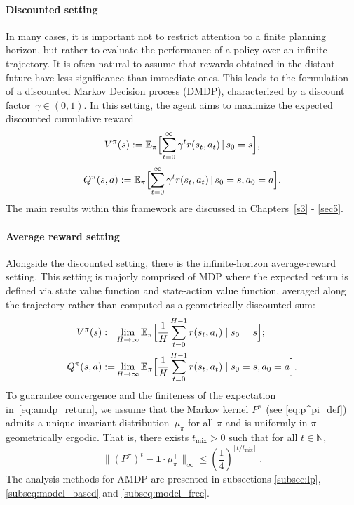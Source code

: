 \documentclass{article}
\numberwithin{equation}{section}
\newcommand{\E}{\mathbb E}
\newcommand{\eqsp}{\;}
\begin{document}
\paragraph{Discounted setting}
In many cases, it is important not to restrict attention to a finite planning horizon, but rather to evaluate the performance of a policy over an infinite trajectory. It is often natural to assume that rewards obtained in the distant future have less significance than immediate ones. This leads to the formulation of a discounted Markov Decision process (DMDP), characterized by a discount factor~$\gamma \in (0,1)$. In this setting, the agent aims to maximize the expected discounted cumulative reward
\begin{equation}\label{eq:value_function}
    V^\pi (s) := \E_\pi \Bigl[ \sum_{t=0}^\infty \gamma^t r(s_t, a_t)\, |\, s_0 = s \Bigr],
\end{equation}
\begin{equation}\label{eq:action_value}
    Q^\pi (s, a) := \E_\pi \Bigl[ \sum_{t=0}^\infty \gamma^t r(s_t, a_t)\, |\, s_0 = s, a_0=a \Bigr].
\end{equation}
The main results within this framework are discussed in Chapters~\ref{s3} - \ref{sec5}.

\paragraph{Average reward setting}
Alongside the discounted setting, there is the infinite-horizon average-reward setting. This setting is majorly comprised of MDP where the expected return is defined via state value function and state-action value function, averaged along the trajectory rather than computed as a geometrically discounted sum:
\begin{equation}\label{eq:amdp_return}
   \begin{aligned}
       V^{\pi} (s) :=& \lim\limits_{H\rightarrow\infty}\mathbb{E}_{\pi}\Bigl[\frac{1}{H}\sum\limits_{t = 0}^{H - 1}r(s_t, a_t)\mid s_0 = s\Bigr];\\
       Q^{\pi} (s, a) :=& \lim\limits_{H\rightarrow\infty}\mathbb{E}_{\pi}\Bigl[\frac{1}{H}\sum\limits_{t = 0}^{H - 1}r(s_t, a_t)\mid s_{0} = s, a_{0} = a\Bigr].
   \end{aligned} 
\end{equation}
To guarantee convergence and the finiteness of the expectation in~\eqref{eq:amdp_return}, we assume that the Markov kernel $P^{\pi}$ (see \eqref{eq:p^pi_def}) admits a unique invariant distribution~$\mu_\pi$ for all $\pi$ and is uniformly in $\pi$ geometrically ergodic. That is, there exists $t_{\operatorname{mix}}>0$ such that for all $t \in \mathbb{N}$,
\begin{equation}
\bigl\| (P^{\pi})^t - \mathbf{1} \cdot \mu^\top_{\pi} \bigr\|_{\infty} 
   \leq \left(\frac{1}{4}\right)^{\lfloor t / t_{\operatorname{mix}} \rfloor}\eqsp.
\end{equation}
The analysis methods for AMDP are presented in subsections \ref{subsec:lp},  \ref{subseq:model_based} and  \ref{subseq:model_free}.
\end{document}
